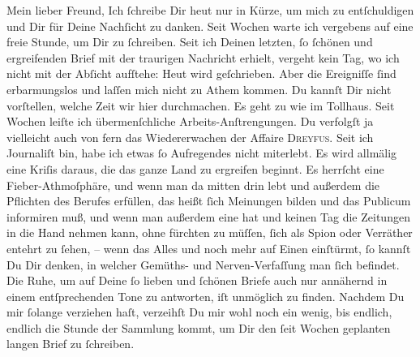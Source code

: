 \pstart\center{}Mein lieber Freund,\pend\vspace{0.5em}
\pstart
           Ich{ }ſchreibe Dir heut nur in Kürze, um mich zu
                  entſchuldigen\strikeout{\textcolor{gray}{.}} und Dir für Deine Nachſicht zu danken. Seit Wochen warte ich vergebens auf
               eine freie Stunde, um \strikeout{\textcolor{gray}{×}\-\textcolor{gray}{×}\-\textcolor{gray}{×}} Dir zu ſchreiben. Seit ich Deinen letzten,{ }ſo{ }ſchönen und ergreifenden Brief mit der
               traurigen Nachricht erhielt, vergeht kein Tag, wo ich nicht mit der Abſicht aufſtehe:
               Heut wird geſchrieben. Aber die Ereigniſſe{ }ſind erbarmungslos und laſſen mich nicht
               zu Athem kommen.  Du kannſt Dir nicht vorſtellen,
               welche Zeit wir {\pb}hier durchmachen. Es geht zu wie im
               Tollhaus. Seit Wochen leiſte ich übermenſchliche Arbeits-Anſtrengungen. Du verfolgſt
               ja vielleicht auch von fern das Wiedererwachen der Affaire \textsc{Dreyfus}. Seit ich Journaliſt bin, habe ich etwas{ }ſo Aufregendes nicht miterlebt. Es
               wird allmälig eine Kriſis daraus, die das ganze Land zu ergreifen beginnt. Es herrſcht eine Fieber-Athmoſphäre,
               und wenn man da mitten drin lebt und außerdem die Pflichten des Berufes erfüllen, das
               heißt{ }ſich Meinungen bilden und das Publicum informiren muß, und wenn man außerdem
               eine \label{K_L02831-1v}\label{K_L02831-1} hat und keinen Tag die Zeitungen in die Hand nehmen kann, ohne fürchten zu
               müſſen,{ }ſich als Spion oder Verräther entehrt zu{ }ſehen, – wenn das Alles und noch
               mehr auf Einen einſtürmt,{ }ſo kannſt Du Dir denken, in welcher Gemüths- und
               Nerven-Verfaſſung man{ }ſich befindet. Die Ruhe, um auf Deine{ }ſo lieben und{ }ſchönen
               Briefe auch nur annähernd in einem  entſprechenden
               Tone zu antworten, iſt unmöglich zu finden. Nachdem {\pb}Du mir{ }ſolange verziehen haſt, verzeihſt Du mir wohl noch ein wenig, bis endlich,
               endlich  die Stunde der Sammlung kommt, um Dir den{ }ſeit Wochen geplanten langen Brief zu{ }ſchreiben.\pend
           
